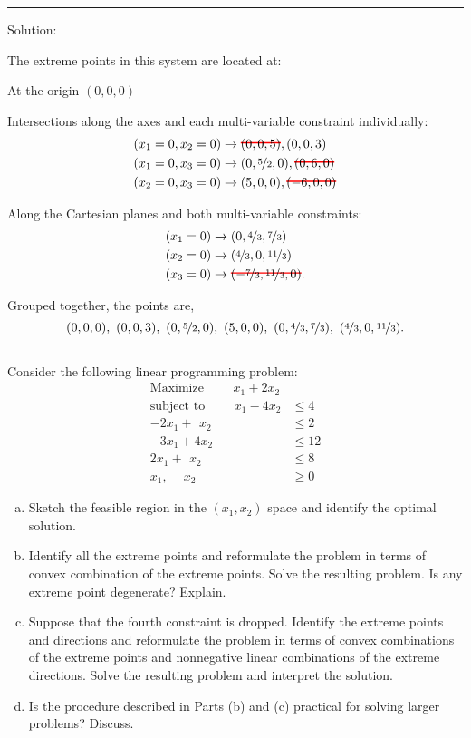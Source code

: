 \documentclass[12pt]{amsart}
\newcommand\hcancel[2][red]{\setbox0=\hbox{$#2$}%
	\rlap{\raisebox{.45\ht0}{\textcolor{#1}{\rule{\wd0}{1pt}}}}#2}
\begin{document}
\medskip \hrule \medskip
Solution:

The extreme points in this system are located at:

At the origin \((0,0,0)\)

Intersections along the axes and each multi-variable constraint individually:
\begin{align*}
	(x_1=0,x_2=0) &\rightarrow \hcancel{(0,0,5)}, (0,0,3) \\
	(x_1=0,x_3=0) &\rightarrow (0,\nicefrac{5}{2},0), \hcancel{(0,6,0)} \\
	(x_2=0,x_3=0) &\rightarrow (5,0,0), \hcancel{(-6,0,0)} \\
\end{align*}

Along the Cartesian planes and both multi-variable constraints:
\begin{align*}
	(x_1=0) &\rightarrow (0,\nicefrac{4}{3},\nicefrac{7}{3}) \\
	(x_2=0) &\rightarrow (\nicefrac{4}{3},0,\nicefrac{11}{3}) \\
	(x_3=0) &\rightarrow \hcancel{(-\nicefrac{7}{3},\nicefrac{11}{3},0)}.
\end{align*}

Grouped together, the points are,
\[
(0,0,0), \ (0,0,3), \ (0,\nicefrac{5}{2},0), \  (5,0,0), \
(0,\nicefrac{4}{3},\nicefrac{7}{3}), \  (\nicefrac{4}{3},0,\nicefrac{11}{3}).
\]


\clearpage
\setcounter{section}{3}
\setcounter{subsection}{0}
\subsection{}
Consider the following linear programming problem:
\begin{align*}
	\text{Maximize }\qquad  x_1 + 2x_2 & \\
	\text{subject to }\qquad x_1 - 4x_2 &\leq 4 \\
 	-2x_1 +\,\ x_2 &\leq 2  \\ 
 	-3x_1 +   4x_2 &\leq 12 \\
	 2x_1 +\,\ x_2 &\leq 8  \\
	  x_1,\quad\   x_2 &\geq 0	  
\end{align*}

\begin{enumerate}[a.]
	\item 
	Sketch the feasible region in the \((x_1,x_2)\) space and identify the optimal solution.
	\item 
	Identify all the extreme points and reformulate the problem in terms of convex combination of the extreme points. 
	Solve the resulting problem. 
	Is any extreme point degenerate? Explain.
	\item 
	Suppose that the fourth constraint is dropped. Identify the extreme points and directions and reformulate the problem in terms of convex combinations of the extreme points and nonnegative linear combinations of the extreme directions. Solve the resulting problem and interpret the solution.
	\item 
	Is the procedure described in Parts (b) and (c) practical for solving larger problems? Discuss.
\end{enumerate}
\end{document}
